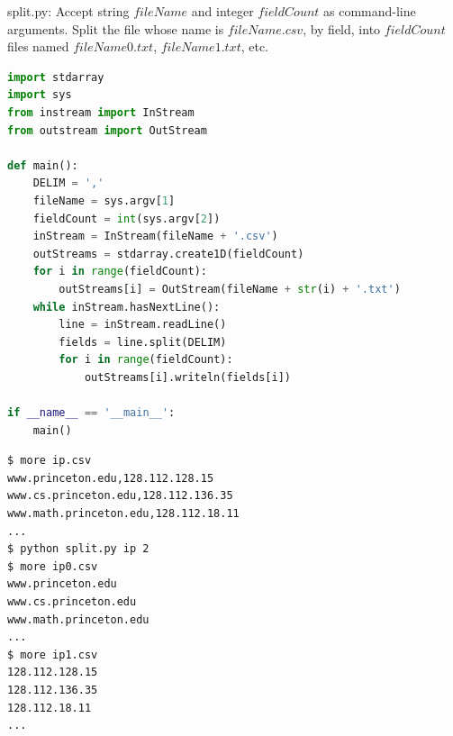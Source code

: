 \documentclass[8pt,a4paper,compress,handout]{beamer}
\begin{document}
\begin{frame}[fragile]
\begin{framed}
\tiny split.py: Accept string $fileName$ and integer $fieldCount$ as command-line arguments. Split the file whose name is $fileName.csv$, by field, into $fieldCount$ files named $fileName0.txt$, $fileName1.txt$, etc.
\end{framed}

\begin{lstlisting}[language=Python]
import stdarray
import sys
from instream import InStream
from outstream import OutStream

def main():
    DELIM = ','
    fileName = sys.argv[1]
    fieldCount = int(sys.argv[2])
    inStream = InStream(fileName + '.csv')
    outStreams = stdarray.create1D(fieldCount)
    for i in range(fieldCount):
        outStreams[i] = OutStream(fileName + str(i) + '.txt')
    while inStream.hasNextLine():
        line = inStream.readLine()
        fields = line.split(DELIM)
        for i in range(fieldCount):
            outStreams[i].writeln(fields[i])

if __name__ == '__main__':
    main()
\end{lstlisting}
\end{frame}

\begin{frame}[fragile]
\begin{lstlisting}[language={}]
$ more ip.csv 
www.princeton.edu,128.112.128.15
www.cs.princeton.edu,128.112.136.35
www.math.princeton.edu,128.112.18.11
...
$ python split.py ip 2
$ more ip0.csv
www.princeton.edu
www.cs.princeton.edu
www.math.princeton.edu
...
$ more ip1.csv
128.112.128.15
128.112.136.35
128.112.18.11
...
\end{lstlisting}
\end{frame}
\end{document}
